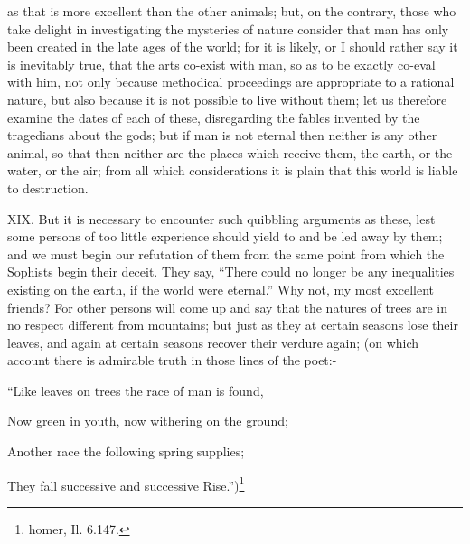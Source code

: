 as that is more excellent than the other animals; but, on the contrary, those who take delight in
investigating the mysteries of nature consider that man has only been created in the late ages of
the world; for it is likely, or I should rather say it is inevitably true, that the arts co-exist with man, so
as to be exactly co-eval with him, not only because methodical proceedings are appropriate to a
rational nature, but also because it is not possible to live without them; let us therefore examine the
dates of each of these, disregarding the fables invented by the tragedians about the gods; but if
man is not eternal then neither is any other animal, so that then neither are the places which
receive them, the earth, or the water, or the air; from all which considerations it is plain that this
world is liable to destruction.

XIX. But it is necessary to encounter such quibbling arguments as these, lest some persons of too
little experience should yield to and be led away by them; and we must begin our refutation of them
from the same point from which the Sophists begin their deceit. They say, ``There could no longer
be any inequalities existing on the earth, if the world were eternal.'' Why not, my most excellent
friends? For other persons will come up and say that the natures of trees are in no respect
different from mountains; but just as they at certain seasons lose their leaves, and again at certain
seasons recover their verdure again; (on which account there is admirable truth in those lines of
the poet:-

``Like leaves on trees the race of man is found,

Now green in youth, now withering on the ground;

Another race the following spring supplies;

They fall successive and successive Rise.'')\footnote{homer, Il. 6.147.}

